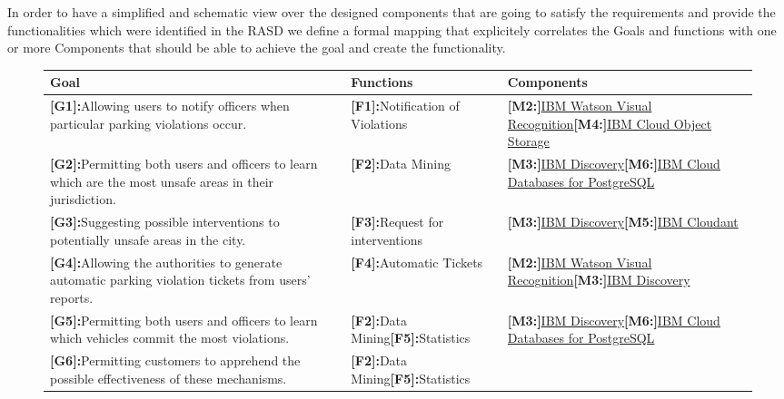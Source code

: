 In order to have a simplified and schematic view over the designed components that are going to satisfy the requirements and provide the functionalities which were identified in the RASD we define a formal mapping that explicitely correlates the Goals and functions with one or more Components that should be able to achieve the goal and create the functionality.

\begin{figure}
\begin{center}
\begin{tabular}{|p{5cm}|p{5cm}|p{5cm}|}
\hline
Goal&Functions&Components\\
\hline
\textbf{[G1]:}Allowing users to notify officers when particular parking violations occur.&
\textbf{[F1]:}Notification of Violations&
\textbf{[M2:]}\hyperlink{watson}{IBM Watson Visual Recognition}\newline\textbf{[M4:]}\hyperlink{cloudObjectStorage}{IBM Cloud Object Storage}\\
\hline
\textbf{[G2]:}Permitting both users and officers to learn which are the most unsafe areas in their jurisdiction.&
\textbf{[F2]:}Data Mining&
\textbf{[M3:]}\hyperlink{discovery}{IBM Discovery}\newline\textbf{[M6:]}\hyperlink{postgres}{IBM Cloud Databases for PostgreSQL}\\
\hline
\textbf{[G3]:}Suggesting possible interventions to potentially unsafe areas in the city.&
\textbf{[F3]:}Request for interventions&
\textbf{[M3:]}\hyperlink{discovery}{IBM Discovery}\newline\textbf{[M5:]}\hyperlink{cloudant}{IBM Cloudant}\\
\hline
\textbf{[G4]:}Allowing the authorities to generate automatic parking violation tickets from users’ reports.&
\textbf{[F4]:}Automatic Tickets&
\textbf{[M2:]}\hyperlink{watson}{IBM Watson Visual Recognition}\newline\textbf{[M3:]}\hyperlink{discovery}{IBM Discovery}\\
\hline
\textbf{[G5]:}Permitting both users and officers to learn which vehicles commit the most violations.&
\textbf{[F2]:}Data Mining\newline\textbf{[F5]:}Statistics&
\textbf{[M3:]}\hyperlink{discovery}{IBM Discovery}\newline\textbf{[M6:]}\hyperlink{postgres}{IBM Cloud Databases for PostgreSQL}\\
\hline
\textbf{[G6]:}Permitting customers to apprehend the possible effectiveness of these mechanisms.&
\textbf{[F2]:}Data Mining\newline\textbf{[F5]:}Statistics&

\end{tabular}
\end{center}
\end{figure}

